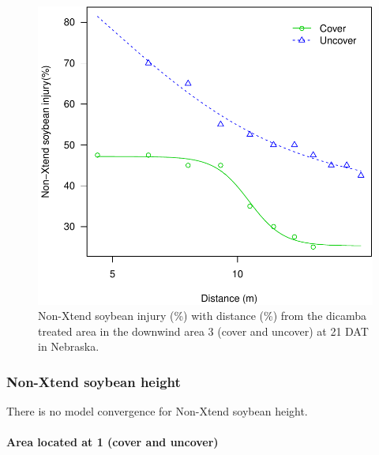 \documentclass[]{article}
\let\oldparagraph\paragraph
\renewcommand{\paragraph}[1]{\oldparagraph{#1}\mbox{}}
\begin{document}
\newpage

\begin{figure}
\centering
\includegraphics{Report_files/figure-latex/unnamed-chunk-79-1.pdf}
\caption{Non-Xtend soybean injury (\%) with distance (\%) from the
dicamba treated area in the downwind area 3 (cover and uncover) at 21
DAT in Nebraska.}
\end{figure}

\newpage

\newpage

\pagebreak

\subsubsection{Non-Xtend soybean
height}\label{non-xtend-soybean-height-4}

There is no model convergence for Non-Xtend soybean height.

\paragraph{Area located at 1 (cover and
uncover)}\label{area-located-at-1-cover-and-uncover}
\end{document}
